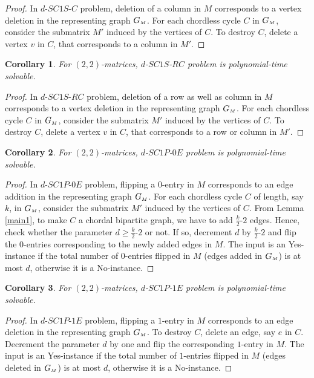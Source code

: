 \documentclass[review, 1p]{elsarticle}
\newtheorem{corollary}{Corollary}
\begin{document}
\begin{proof}
 In $d$-$SC1S$-$C$ problem, deletion of a column in $M$ corresponds to a vertex deletion in the representing graph $G_{\mathsmaller M}$. For each chordless cycle $C$ in $G_{\mathsmaller{M}}$, consider the submatrix $M'$ induced by the vertices of $C$. To destroy $C$, delete a vertex $v$ in $C$, that corresponds to a column in $M'$.   
 \end{proof}
 \begin{corollary}
For $(2,2)$-matrices, $d$-$SC1S$-$RC$ problem is polynomial-time solvable.
\end{corollary}
\begin{proof}
In $d$-$SC1S$-$RC$ problem, deletion of a row as well as column in $M$ corresponds to a vertex deletion in the representing graph $G_{\mathsmaller M}$. For each chordless cycle $C$ in $G_{\mathsmaller{M}}$, consider the submatrix $M'$ induced by the vertices of $C$. To destroy $C$, delete a vertex $v$ in $C$, that corresponds to a row or column in $M'$. 
\end{proof}
\begin{corollary}
For $(2,2)$-matrices, $d$-$SC1P$-$0E$ problem is polynomial-time solvable.
\end{corollary}
\begin{proof}
In $d$-$SC1P$-$0E$ problem, flipping a $0$-entry in $M$ corresponds to an edge addition in the representing graph $G_{\mathsmaller{M}}$. For each chordless cycle $C$ of length, say $k$, in $G_{\mathsmaller{M}}$, consider the submatrix $M'$ induced by the vertices of $C$. From Lemma \ref{main1}, to make $C$ a chordal bipartite graph, we have to add $\frac {k} {2}$-$2$ edges. Hence, check whether the parameter $d \geq \frac {k} {2}$-$2$ or not. If so, decrement $d$ by $\frac {k} {2}$-$2$ and flip the $0$-entries corresponding to the newly added edges in $M$. The input is an Yes-instance if the total number of $0$-entries flipped in $M$ (edges added in $G_{\mathsmaller{M}}$) is at most $d$, otherwise it is a No-instance. 
\end{proof}
\begin{corollary}\label{cor1}
For $(2,2)$-matrices, $d$-$SC1P$-$1E$ problem is polynomial-time solvable.
\end{corollary}
\begin{proof}
In $d$-$SC1P$-$1E$ problem, flipping a $1$-entry in $M$ corresponds to an edge deletion in the representing graph $G_{\mathsmaller{M}}$. To destroy $C$, delete an edge, say $e$ in $C$. Decrement the parameter $d$ by one and flip the corresponding $1$-entry in $M$. The input is an Yes-instance if the total number of $1$-entries flipped in $M$ (edges deleted in $G_{\mathsmaller{M}}$) is at most $d$, otherwise it is a No-instance. 
\end{proof}
\end{document}
